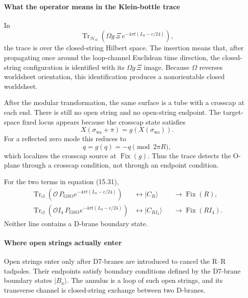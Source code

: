 \documentclass[
  10pt,
  a4paper,
  openany]{book}
\begin{document}
\paragraph{What the operator means in the Klein-bottle
trace}\label{what-the-operator-means-in-the-klein-bottle-trace}

In \[
\operatorname{Tr}_{\mathcal H_{\mathrm{cl}}}
\left(
\Omega g\,\Xi\,
e^{-4\pi t(L_0-c/24)}
\right),
\] the trace is over the closed-string Hilbert space. The insertion
means that, after propagating once around the loop-channel Euclidean
time direction, the closed-string configuration is identified with its
\(\Omega g\,\Xi\) image. Because \(\Omega\) reverses worldsheet
orientation, this identification produces a nonorientable closed
worldsheet.

After the modular transformation, the same surface is a tube with a
crosscap at each end. There is still no open string and no open-string
endpoint. The target-space fixed locus appears because the crosscap
state satisfies \[
X(\sigma_{\mathrm{ws}}+\pi)
=
g\!\left(X(\sigma_{\mathrm{ws}})\right).
\] For a reflected zero mode this reduces to \[
q=g(q)=-q
\pmod{2\pi R},
\] which localizes the crosscap source at \(\operatorname{Fix}(g)\).
Thus the trace detects the O-plane through a crosscap condition, not
through an endpoint condition.

For the two terms in equation (15.31), \[
\begin{aligned}
\operatorname{Tr}_{\mathrm{cl}}
\left(
\mathcal O\,P_{\mathrm{GSO}}e^{-4\pi t(L_0-c/24)}
\right)
&\longleftrightarrow
|C_R\rangle
&&\longrightarrow
\operatorname{Fix}(R),\\
\operatorname{Tr}_{\mathrm{cl}}
\left(
\mathcal OI_4\,P_{\mathrm{GSO}}e^{-4\pi t(L_0-c/24)}
\right)
&\longleftrightarrow
|C_{RI_4}\rangle
&&\longrightarrow
\operatorname{Fix}(RI_4).
\end{aligned}
\] Neither line contains a D-brane boundary state.

\paragraph{Where open strings actually
enter}\label{where-open-strings-actually-enter}

Open strings enter only after D7-branes are introduced to cancel the
R--R tadpoles. Their endpoints satisfy boundary conditions defined by
the D7-brane boundary states \(|B_a\rangle\). The annulus is a loop of
such open strings, and its transverse channel is closed-string exchange
between two D-branes.
\end{document}
